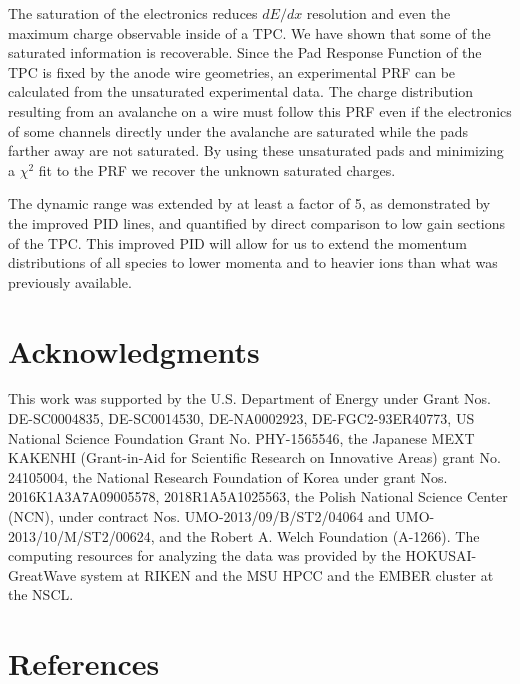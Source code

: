 \documentclass[review]{elsarticle}
\begin{document}
The saturation  of the electronics reduces $dE/dx$ resolution and even the maximum charge observable inside of a TPC.  We have shown that some of the saturated information is recoverable. Since the Pad Response Function of the TPC is fixed by the anode wire geometries, an experimental PRF can be calculated from the unsaturated experimental data. The charge distribution resulting from an avalanche on a wire must follow this PRF even if the electronics of some channels directly under the avalanche are saturated while the pads farther away are not saturated. By using these unsaturated pads and minimizing a $\chi^2$ fit  to the PRF we recover the unknown saturated charges. 

The dynamic range was extended by at least a factor of 5, as demonstrated by the improved PID lines, and quantified by direct comparison to low gain sections of the TPC. This improved PID will allow for us to extend the momentum distributions of all species to lower momenta and to heavier ions than what was previously available. 


\section{Acknowledgments}
This work was supported by the U.S. Department of Energy under Grant Nos.  DE-SC0004835,  DE-SC0014530, DE-NA0002923, DE-FGC2-93ER40773,  US  National Science Foundation Grant  No.  PHY-1565546, the  Japanese  MEXT  KAKENHI (Grant-in-Aid  for  Scientific  Research  on  Innovative  Areas)  grant  No. 24105004, the National Research Foundation of Korea under grant Nos. 2016K1A3A7A09005578, 2018R1A5A1025563,  the Polish National Science Center (NCN), under contract Nos. UMO-2013/09/B/ST2/04064 and UMO-2013/10/M/ST2/00624, and the Robert A. Welch Foundation (A-1266). The computing resources for analyzing the data was provided by the HOKUSAI-GreatWave system at RIKEN and the MSU HPCC and the EMBER cluster at the NSCL. 

\section*{References}


\end{document}
